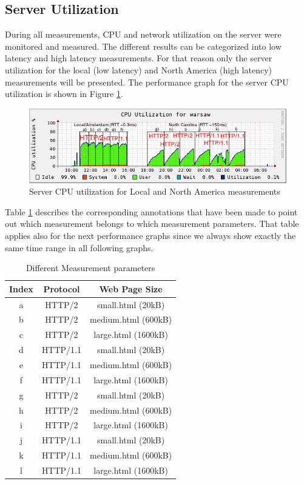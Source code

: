 \subsection{Server Utilization}
\label{subsec:server_util}

During all measurements, CPU and network utilization on the server were monitored and measured. The different results can be categorized into low latency and high latency measurements. For that reason only the server utilization for the local (low latency) and North America (high latency) measurements will be presented. The performance graph for the server CPU utilization is shown in Figure \ref{fig:cpu}.  

\begin{figure}[H]
\centering
\includegraphics[scale=0.6,trim=0.0cm .0cm .0cm .0cm,clip]{images/cpu3.png}
\caption{Server CPU utilization for Local and North America measurements}
\label{fig:cpu}
\end{figure}

Table \ref{table:cpu} describes the corresponding annotations that have been made to point out which measurement belongs to which measurement parameters. That table applies also for the next performance graphs since we always show exactly the same time range in all following graphs.

\begin{table}[h]
	\centering
\begin{tabular}{ | c | c | c | }

\hline
\textbf{Index} &\textbf{Protocol} &\textbf{Web Page Size}\\ \hline \hline
a & HTTP/2 & small.html (20kB)\\ \hline
b & HTTP/2 & medium.html (600kB)\\ \hline
c & HTTP/2 & large.html (1600kB)\\ \hline
d & HTTP/1.1 & small.html (20kB) \\ \hline
e & HTTP/1.1 & medium.html (600kB) \\ \hline
f & HTTP/1.1 & large.html (1600kB)\\ \hline 
g & HTTP/2 & small.html (20kB)\\ \hline
h & HTTP/2 & medium.html (600kB)\\ \hline
i & HTTP/2 & large.html (1600kB)\\ \hline
j & HTTP/1.1 & small.html (20kB) \\ \hline
k & HTTP/1.1 & medium.html (600kB) \\ \hline
l & HTTP/1.1 & large.html (1600kB)\\  
\hline
\end{tabular}
\caption{Different Measurement parameters}
\label{table:cpu}
\end{table} 
 
